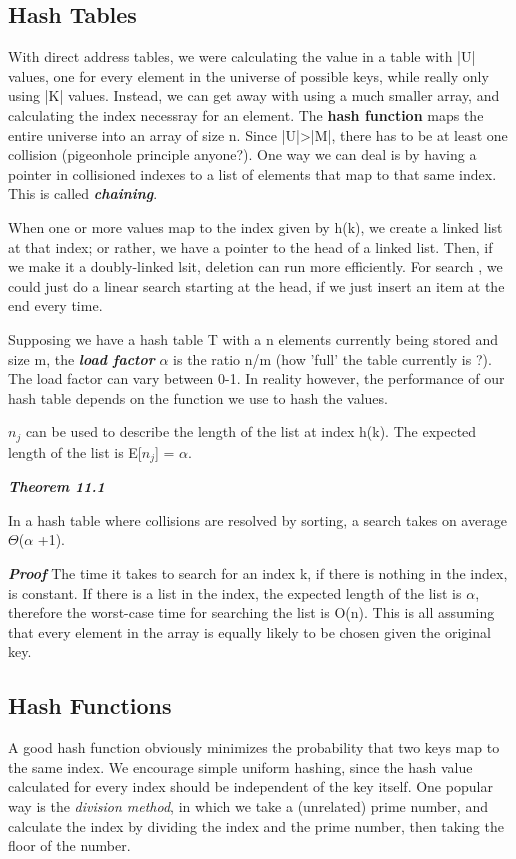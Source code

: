 \documentclass{article}
\begin{document}
\subsection{Hash Tables}
With direct address tables, we were calculating the value in a table with |U| values, one for every element 
in the universe of possible keys, while really only using |K| values. Instead, we can get away with using a 
much smaller array, and calculating the index necessray for an element. The \textbf{hash function} maps the
entire universe into an array of size n. Since |U|>|M|, there has to be at least one collision (pigeonhole
principle anyone?). One way we can deal is by having a pointer in collisioned indexes to a list of 
elements that map to that same index. This is called \textbf{\textit{chaining}}.

When one or more values map to the index given by h(k), we create a linked list at that index; or rather, we 
have a pointer to the head of a linked list. Then, if we make it a doubly-linked lsit, deletion can run
more efficiently. For search , we could just do a linear search starting at the head, if we just insert 
an item at the end every time. 

Supposing we have a hash table T with a n elements currently being stored and size m, the 
\textit{\textbf{load factor}} $\alpha$ is the ratio n/m (how 'full' the table currently is ?). The load 
factor can vary between 0-1. In reality however, the performance of our hash table depends on the 
function we use to hash the values. 

$n_{j}$ can be used to describe the length of the list at index h(k). The expected length of the list is 
E[$n_{j}$] = $\alpha$.

\textbf{\textit{Theorem 11.1}}

In a hash table where collisions are resolved by sorting, a search takes on average $\Theta$($\alpha$ +1).

\textbf{\textit{Proof}} The time it takes to search for an index k, if there is nothing in the index, is constant.
If there is a list in the index, the expected length of the list is $\alpha$, therefore the worst-case
time for searching the list is O(n). This is all assuming that every element in the array is equally likely 
to be chosen given the original key.
\subsection{Hash Functions}
A good hash function obviously minimizes the probability that two keys map to the same index. We encourage 
simple uniform hashing, since the hash value calculated for every index should be independent of the key 
itself. One popular way is the \textit{division method}, in which we take a (unrelated) prime number, and 
calculate the index by dividing the index and the prime number, then taking the floor of the number. 
\end{document}
